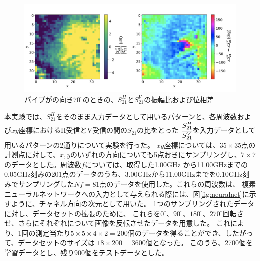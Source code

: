 \documentclass[11pt,a4paper,uplatex]{ujarticle}
\begin{document}
\begin{figure}[tbp]
\begin{minipage}[b]{0.995\textwidth}
    \end{minipage}\\
    \begin{minipage}[b]{0.995\textwidth}
      \centering
      \includegraphics[keepaspectratio, width=140mm]{Images/python/yokonarabe/diff/processed/170.png}
    \end{minipage}
    \caption{パイプがの向き$70^{\circ}$のときの、$S_{21}^{H}$と$S_{21}^{V}$の振幅比および位相差}
  \end{figure}
  

  本実験では、$S_{21}^{H}$をそのまま入力データとして用いるパターンと、各周波数および$xy$座標におけるH受信とV受信の間の$S_{21}$の比をとった
  $\cfrac{S_{21}^{H}}{S_{21}^{V}}$を入力データとして用いるパターンの2通りについて実験を行った。
  $xy$座標については、$35\times35$点の計測点に対して、$x,y$のいずれの方向についても5点おきにサンプリングし、$7\times7$のデータとした。周波数$f$については、取得した1.00GHz
  から11.00GHzまでの0.05GHz刻みの201点のデータのうち、3.00GHzから11.00GHzまでを0.10GHz刻みでサンプリングした$Nf = 81$点のデータを使用した。これらの周波数は、
  複素ニューラルネットワークへの入力として与えられる際には、図\ref{fig:neuralnet}に示すように、チャネル方向の次元として用いた。
  1つのサンプリングされたデータに対し、データセットの拡張のために、
  これらを$0^\circ$、$90^\circ$、$180^\circ$、$270^\circ$回転させ、さらにそれぞれについて画像を反転させたデータを用意した。
  これにより、1回の測定当たり$5\times 5 \times 4 \times 2 = 200$個のデータを得ることができ、したがって、データセットのサイズは
  $18\times 200 = 3600$個となった。
  このうち、2700個を学習データとし、残り900個をテストデータとした。
  
\end{document}
